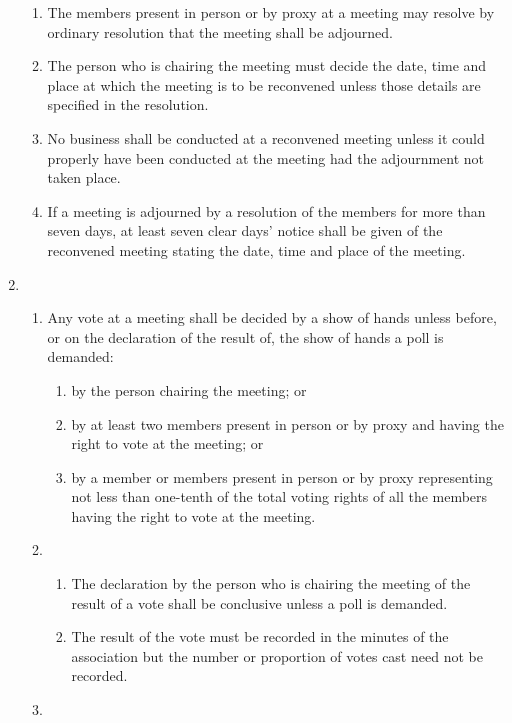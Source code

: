 \begin{enumerate}
  \begin{enumerate}
  \item
    The members present in person or by proxy at a meeting may resolve
    by ordinary resolution that the meeting shall be adjourned.
  \item
    The person who is chairing the meeting must decide the date, time
    and place at which the meeting is to be reconvened unless those
    details are specified in the resolution.
  \item
    No business shall be conducted at a reconvened meeting unless it
    could properly have been conducted at the meeting had the
    adjournment not taken place.
  \item
    If a meeting is adjourned by a resolution of the members for more
    than seven days, at least seven clear days' notice shall be given
    of the reconvened meeting stating the date, time and place of the
    meeting.
  \end{enumerate}
\item
  

  \begin{enumerate}
  \item
    Any vote at a meeting shall be decided by a show of hands unless
    before, or on the declaration of the result of, the show of hands a
    poll is demanded:
    \begin{enumerate}
    \item
      by the person chairing the meeting; or
    \item
      by at least two members present in person or by proxy and having
      the right to vote at the meeting; or
    \item
      by a member or members present in person or by proxy representing
      not less than one-tenth of the total voting rights of all the
      members having the right to vote at the meeting.
    \end{enumerate}
  \item
    

    \begin{enumerate}
    \item
      The declaration by the person who is chairing the meeting of the
      result of a vote shall be conclusive unless a poll is demanded.
    \item
      The result of the vote must be recorded in the minutes of the
      association but the number or proportion of votes cast need not be
      recorded.
    \end{enumerate}
  \item
    


\end{enumerate}
\end{enumerate}
